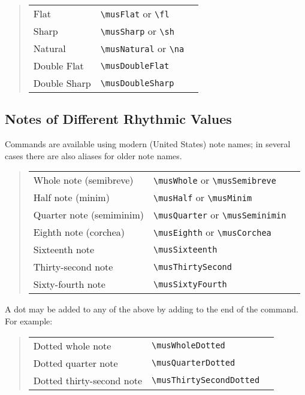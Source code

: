 \documentclass{article}
\newenvironment{codetable}
{\begin{quote}\begin{tabular}{lll}}
{\end{tabular}\end{quote}}
\begin{document}
\begin{codetable}
    Flat & \verb|\musFlat| or \verb|\fl| & \musFlat\\
    Sharp & \verb|\musSharp| or \verb|\sh| & \musSharp\\
    Natural & \verb|\musNatural| or \verb|\na| & \musNatural\\
    Double Flat & \verb|\musDoubleFlat| & \musDoubleFlat\\
    Double Sharp & \verb|\musDoubleSharp| & \musDoubleSharp\\
\end{codetable}

\subsection{Notes of Different Rhythmic Values}

Commands are available using modern (United States) note names; in several cases
there are also aliases for older note names.

\begin{codetable}
    Whole note (semibreve) & \verb|\musWhole| or \verb|\musSemibreve| &
    \musWhole\\
    Half note (minim) & \verb|\musHalf| or \verb|\musMinim| & \musHalf\\
    Quarter note (semiminim) & \verb|\musQuarter| or \verb|\musSeminimin| &
    \musQuarter\\
    Eighth note (corchea) & \verb|\musEighth| or \verb|\musCorchea| &
    \musEighth\\
    Sixteenth note & \verb|\musSixteenth| & \musSixteenth\\
    Thirty-second note & \verb|\musThirtySecond| & \musThirtySecond\\
    Sixty-fourth note & \verb|\musSixtyFourth| & \musSixtyFourth\\
\end{codetable}

A dot may be added to any of the above by adding  to the end of the
command. For example:

\begin{codetable}
    Dotted whole note & \verb|\musWholeDotted| & \musWholeDotted\\
    Dotted quarter note & \verb|\musQuarterDotted| & \musQuarterDotted\\
    Dotted thirty-second note & \verb|\musThirtySecondDotted| &
    \musThirtySecondDotted\\
\end{codetable}
\end{document}
